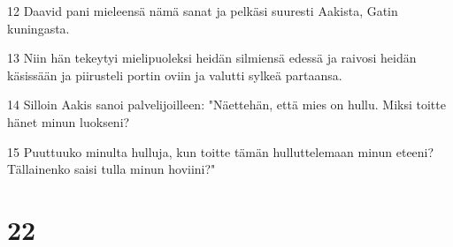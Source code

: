 \par 12 Daavid pani mieleensä nämä sanat ja pelkäsi suuresti Aakista, Gatin kuningasta.
\par 13 Niin hän tekeytyi mielipuoleksi heidän silmiensä edessä ja raivosi heidän käsissään ja piirusteli portin oviin ja valutti sylkeä partaansa.
\par 14 Silloin Aakis sanoi palvelijoilleen: "Näettehän, että mies on hullu. Miksi toitte hänet minun luokseni?
\par 15 Puuttuuko minulta hulluja, kun toitte tämän hulluttelemaan minun eteeni? Tällainenko saisi tulla minun hoviini?"

\chapter{22}

